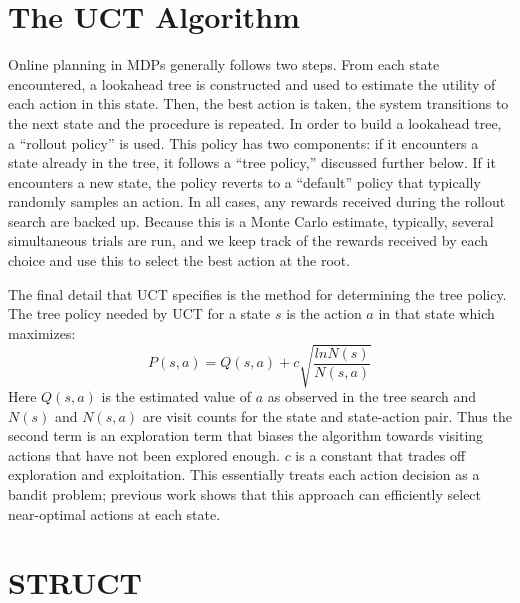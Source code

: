 \section{The UCT Algorithm}

Online planning in MDPs generally follows two steps. From each state
encountered, a lookahead tree is constructed and used to estimate the
utility of each action in this state. Then, the best action is taken,
the system transitions to the next state and the procedure is
repeated. In order to build a lookahead tree, a ``rollout policy'' is
used. This policy has two components: if it encounters a state already
in the tree, it follows a ``tree policy,'' discussed further below. If
it encounters a new state, the policy reverts to a ``default'' policy
that typically randomly samples an action. In all cases, any rewards
received during the rollout search are backed up. Because this is a
Monte Carlo estimate, typically, several simultaneous trials are run,
and we keep track of the rewards received by each choice and
use this to select the best action at the root.

The final detail that UCT specifies is the method for determining the tree policy.
The tree policy needed by UCT for a state $s$ is the action $a$ in that state which maximizes:
\begin{equation}
P(s,a) = Q(s,a) + c\sqrt{\frac{ln N(s)}{N(s,a)}}\label{eqn:uct}
\end{equation}
Here $Q(s,a)$ is the estimated value of $a$ as observed in the tree
search and $N(s)$ and $N(s,a)$ are visit counts for the state and
state-action pair. Thus the second term is an exploration term that
biases the algorithm towards visiting actions that have not been
explored enough. $c$ is a constant that trades off exploration and
exploitation. This essentially treats each action decision
as a bandit problem; previous work shows that this approach can
efficiently select near-optimal actions at each state.

\section{STRUCT}
